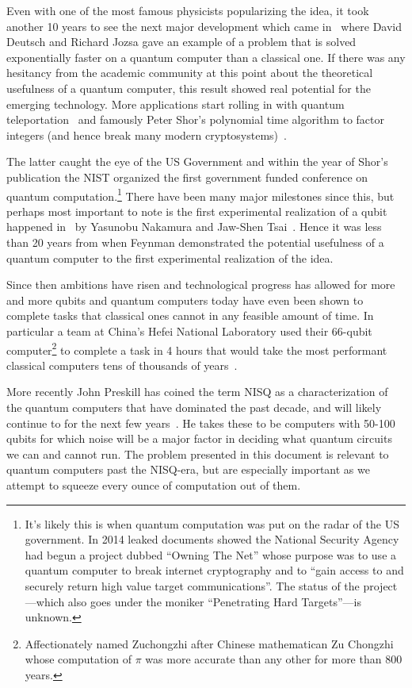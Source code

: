 Even with one of the most famous physicists popularizing the idea, it took another 10 years to see the next major development which came in~\cite{deutch-jozsa-algo} where David Deutsch and Richard Jozsa gave an example of a problem that is solved exponentially faster on a quantum computer than a classical one.
If there was any hesitancy from the academic community at this point about the theoretical usefulness of a quantum computer, this result showed real potential for the emerging technology.
More applications start rolling in with quantum teleportation~\cite{quantumteleportation} and famously Peter Shor's polynomial time algorithm to factor integers (and hence break many modern cryptosystems)~\cite{shor-encryption}.

The latter caught the eye of the US Government and within the year of Shor's publication the \ac{NIST} organized the first government funded conference on quantum computation.\footnote{It's likely this is when quantum computation was put on the radar of the US government. In 2014 leaked documents showed the National Security Agency had begun a project dubbed ``Owning The Net'' whose purpose was to use a quantum computer to break internet cryptography and to ``gain access to and securely return high value target communications''. The status of the project---which also goes under the moniker ``Penetrating Hard Targets''---is unknown.}
There have been many major milestones since this, but perhaps most important to note is the first experimental realization of a qubit happened in~\citeyear{firstqubit} by Yasunobu Nakamura and Jaw-Shen Tsai~\cite{firstqubit}.
Hence it was less than 20 years from when Feynman demonstrated the potential usefulness of a quantum computer to the first experimental realization of the idea.

Since then ambitions have risen and technological progress has allowed for more and more qubits and quantum computers today have even been shown to complete tasks that classical ones cannot in any feasible amount of time.
In particular a team at China's Hefei National Laboratory used their 66-qubit computer\footnote{Affectionately named Zuchongzhi after Chinese mathematican Zu Chongzhi whose computation of $\pi$ was more accurate than any other for more than 800 years.} to complete a task in 4 hours that would take the most performant classical computers tens of thousands of years~\cite{zuchongzhi}.

More recently John Preskill has coined the term \ac{NISQ} as a characterization of the quantum computers that have dominated the past decade, and will likely continue to for the next few years~\cite{nisq}.
He takes these to be computers with 50-100 qubits for which noise will be a major factor in deciding what quantum circuits we can and cannot run.
The problem presented in this document is relevant to quantum computers past the \ac{NISQ}-era, but are especially important as we attempt to squeeze every ounce of computation out of them.

